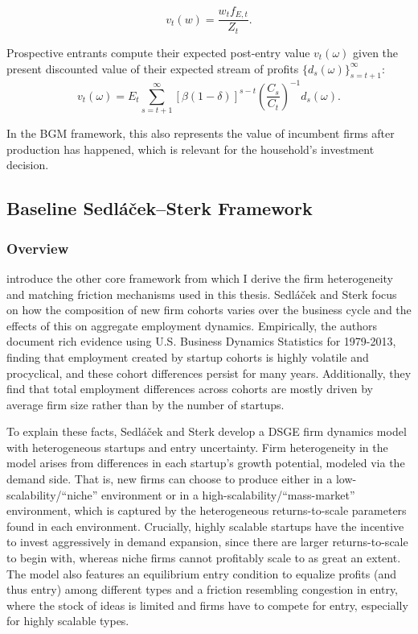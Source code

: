 \documentclass[a4paper,12pt]{article} %
\numberwithin{equation}{section} %
\numberwithin{figure}{section}
\numberwithin{table}{section}
\begin{document}
\[
    v_t(w) = \frac{w_t f_{E,t}}{Z_t}.
\]

Prospective entrants compute their expected post-entry value $v_t(\omega)$ given the present discounted value of their expected stream of profits
$\{d_s(\omega)\}_{s=t+1}^\infty$: 
$$v_{t}(\omega) = E_t \sum_{s = t+1}^{\infty} \left[ \beta (1 - \delta) \right]^{s - t} \left( \frac{C_{s}}{C_{t}} \right)^{-1} d_{s}(\omega).$$

In the BGM framework, this also represents the value of incumbent firms after production has happened, which is relevant for the household's investment decision.



\subsection{Baseline Sedláček–Sterk Framework}
\label{sec:model-sedlacek}

\subsubsection{Overview}

\textcite{sedlavcek2017growth} introduce the other core framework from which I derive the firm heterogeneity and matching friction mechanisms used in this thesis. 
Sedláček and Sterk focus on how the composition of new firm cohorts varies over the business cycle and the effects of this on aggregate employment dynamics. 
Empirically, the authors document rich evidence using U.S. Business Dynamics Statistics for 1979-2013, finding that employment created by startup cohorts is highly
volatile and procyclical, and these cohort differences persist for many years. Additionally, they find that total employment differences across cohorts are mostly
driven by average firm size rather than by the number of startups.

To explain these facts, Sedláček and Sterk develop a DSGE firm dynamics model with heterogeneous startups and entry uncertainty. Firm heterogeneity in the model arises
from differences in each startup's growth potential, modeled via the demand side. That is, new firms can choose to produce either in a low-scalability/``niche'' 
environment or in a high-scalability/``mass-market'' environment, which is captured by the heterogeneous returns-to-scale parameters found in each environment. 
Crucially, highly scalable startups have the incentive to invest aggressively in demand expansion, since there are larger returns-to-scale to begin with, 
whereas niche firms cannot profitably scale to as great an extent. The model also features an equilibrium entry condition to equalize profits (and thus entry) 
among different types and a friction resembling congestion in entry, where the stock of ideas is limited and firms have to compete for entry, especially for 
highly scalable types.
\end{document}
